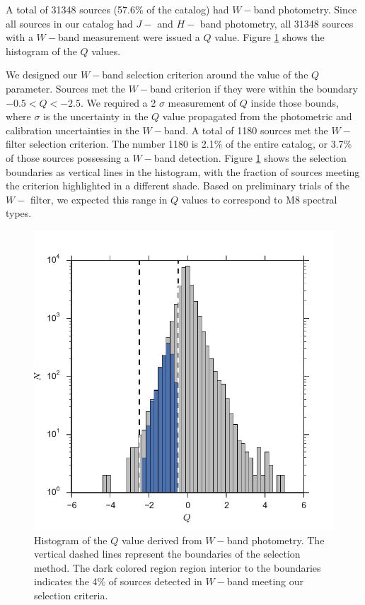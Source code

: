\documentclass[12pt,preprint]{aastex}
\begin{document}
A total of 31348 sources (57.6\% of the catalog) had $W-$band photometry.  Since all sources in our catalog had $J-$ and $H-$ band photometry, all 31348 sources with a $W-$band measurement were issued a $Q$ value.  Figure \ref{fig_Q_value_histogram} shows the histogram of the $Q$ values.

We designed our $W-$band selection criterion around the value of the $Q$ parameter. Sources met the $W-$band criterion if they were within the boundary $-0.5<Q<-2.5$.  We required a 2 $\sigma$ measurement of $Q$ inside those bounds, where $\sigma$ is the uncertainty in the $Q$ value propagated from the photometric and calibration uncertainties in the $W-$band.  A total of 1180 sources met the $W-$filter selection criterion.  The number 1180 is 2.1\% of the entire catalog, or 3.7\% of those sources possessing a $W-$band detection.  Figure \ref{fig_Q_value_histogram} shows the selection boundaries as vertical lines in the histogram, with the fraction of sources meeting the criterion highlighted in a different shade.  Based on preliminary trials of the $W-$ filter, we expected this range in $Q$ values to correspond to M8 spectral types.

\begin{figure}[ht!]
	\caption{Histogram of the $Q$ value derived from $W-$band photometry.  The vertical dashed lines represent the boundaries of the selection method.  The dark colored region region interior to the boundaries indicates the 4\% of sources detected in $W-$band meeting our selection criteria.  \label{fig_Q_value_histogram}}
\centering
\includegraphics[scale=0.6]{figures/W_phot_sel_mgs}
\end{figure}
\end{document}
